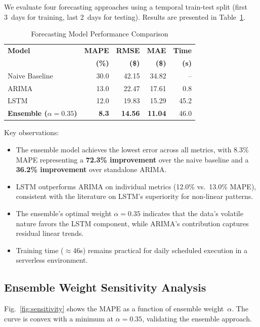 \documentclass[conference]{IEEEtran}
\begin{document}
We evaluate four forecasting approaches using a temporal train-test split (first 3~days for training, last 2~days for testing). Results are presented in Table~\ref{tab:forecast}.

\begin{table}[htbp]
\caption{Forecasting Model Performance Comparison}
\label{tab:forecast}
\centering
\begin{tabular}{@{}lrrrr@{}}
\toprule
\textbf{Model} & \textbf{MAPE} & \textbf{RMSE} & \textbf{MAE} & \textbf{Time} \\
 & \textbf{(\%)} & \textbf{(\$)} & \textbf{(\$)} & \textbf{(s)} \\
\midrule
Naive Baseline & 30.0 & 42.15 & 34.82 & -- \\
ARIMA & 13.0 & 22.47 & 17.61 & 0.8 \\
LSTM & 12.0 & 19.83 & 15.29 & 45.2 \\
\textbf{Ensemble ($\alpha\!=\!0.35$)} & \textbf{8.3} & \textbf{14.56} & \textbf{11.04} & 46.0 \\
\bottomrule
\end{tabular}
\end{table}

Key observations:
\begin{itemize}
    \item The ensemble model achieves the lowest error across all metrics, with 8.3\% MAPE representing a \textbf{72.3\% improvement} over the naive baseline and a \textbf{36.2\% improvement} over standalone ARIMA.
    \item LSTM outperforms ARIMA on individual metrics (12.0\% vs.\ 13.0\% MAPE), consistent with the literature on LSTM's superiority for non-linear patterns.
    \item The ensemble's optimal weight $\alpha = 0.35$ indicates that the data's volatile nature favors the LSTM component, while ARIMA's contribution captures residual linear trends.
    \item Training time ($\approx$46s) remains practical for daily scheduled execution in a serverless environment.
\end{itemize}

\subsection{Ensemble Weight Sensitivity Analysis}

Fig.~\ref{fig:sensitivity} shows the MAPE as a function of ensemble weight~$\alpha$. The curve is convex with a minimum at $\alpha = 0.35$, validating the ensemble approach.
\end{document}
